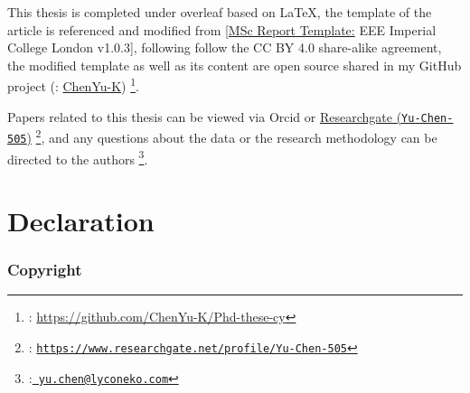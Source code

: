 This thesis is completed under overleaf based on \LaTeX, the template of the article is referenced and modified from [\hyperlink{https://www.overleaf.com/latex/templates/msc-report-template-eee-imperial-college-london-v1-dot-0-3/qtkpngktpwpw}{MSc Report Template:} EEE Imperial College London v1.0.3], following follow the CC BY 4.0 share-alike agreement, the modified template as well as its content are open source shared in my GitHub project (\faGithub : \hyperlink{https://github.com/ChenYu-K/Phd-these-cy}{ChenYu-K}) \footnote{\faGithub : \url{https://github.com/ChenYu-K/Phd-these-cy}}.

Papers related to this thesis can be viewed via Orcid  or \hyperlink{https://www.researchgate.net/profile/Yu-Chen-505}{Researchgate (\texttt{Yu-Chen-505})} \footnote{\aiResearchGate: {\href{https://www.researchgate.net/profile/Yu-Chen-505}{\texttt{https://www.researchgate.net/profile/Yu-Chen-505}}}}, and any questions about the data or the research methodology can be directed to the authors \footnote{\faEnvelope:{\href{mailto:yu.chen@lyconeko.com}{\texttt{ yu.chen@lyconeko.com}}}}.






\cleardoublepage{}
{}\mtcaddchapter 
\chapter*{Declaration}
\thispagestyle{plain}
\addtocounter{counter}{-1}


\subsection*{Copyright}

